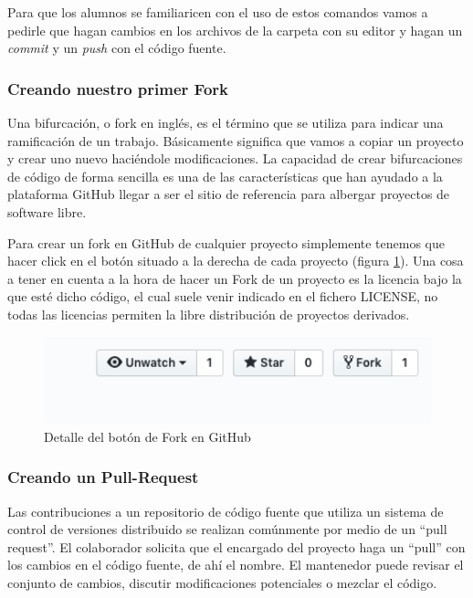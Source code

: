 Para que los alumnos se familiaricen con el uso de estos comandos vamos a pedirle que hagan cambios en los archivos de la carpeta  con su editor y hagan un \textit{commit} y un \textit{push} con el código fuente.

\subsubsection{Creando nuestro primer Fork}

Una bifurcación, o fork en inglés, es el término que se utiliza para indicar una ramificación de un trabajo. Básicamente significa que vamos a copiar un proyecto y crear uno nuevo haciéndole modificaciones. La capacidad de crear bifurcaciones de código de forma sencilla es una de las características que han ayudado a la plataforma GitHub llegar a ser el sitio de referencia para albergar proyectos de software libre.

\bigskip
Para crear un fork en GitHub de cualquier proyecto simplemente tenemos que hacer click en el botón situado a la derecha de cada proyecto (figura \ref{fig:git_fork}). Una cosa a tener en cuenta a la hora de hacer un Fork de un proyecto es la licencia bajo la que esté dicho código, el cual suele venir indicado en el fichero LICENSE, no todas las licencias permiten la libre distribución de proyectos derivados.

\begin{figure}[H]
\centering
\includegraphics[width=1.0\textwidth]{../images/git_fork}
\caption{Detalle del botón de Fork en GitHub}
\label{fig:git_fork}
\end{figure}

\subsubsection{Creando un Pull-Request}

Las contribuciones a un repositorio de código fuente que utiliza un sistema de control de versiones distribuido se realizan comúnmente por medio de un ``pull request''. El colaborador solicita que el encargado del proyecto haga un ``pull'' con los cambios en el código fuente, de ahí el nombre. El mantenedor puede revisar el conjunto de cambios, discutir modificaciones potenciales o mezclar el código.

